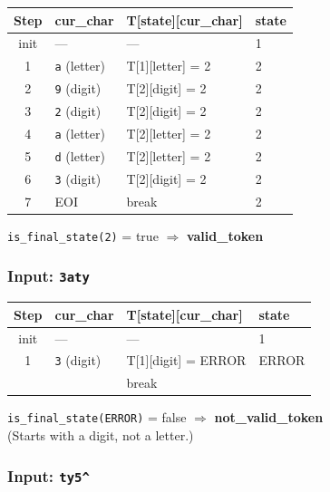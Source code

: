 \documentclass[a4paper,12pt]{article}
\begin{document}
\begin{center}
\renewcommand{\arraystretch}{1.2}
\begin{tabular}{c|l|l|l}
\toprule
\textbf{Step} & \textbf{cur\_char} & \textbf{T[state][cur\_char]} & \textbf{state} \\
\midrule
init  & ---           & ---                       & 1 \\
1     & \texttt{a} (letter) & T[1][letter] = 2    & 2 \\
2     & \texttt{9} (digit)  & T[2][digit] = 2     & 2 \\
3     & \texttt{2} (digit)  & T[2][digit] = 2     & 2 \\
4     & \texttt{a} (letter) & T[2][letter] = 2    & 2 \\
5     & \texttt{d} (letter) & T[2][letter] = 2    & 2 \\
6     & \texttt{3} (digit)  & T[2][digit] = 2     & 2 \\
7     & EOI                 & break                & 2 \\
\bottomrule
\end{tabular}
\end{center}
\texttt{is\_final\_state(2)} = true $\Rightarrow$ \textbf{valid\_token}

\subsubsection*{Input: \texttt{3aty}}

\begin{center}
\renewcommand{\arraystretch}{1.2}
\begin{tabular}{c|l|l|l}
\toprule
\textbf{Step} & \textbf{cur\_char} & \textbf{T[state][cur\_char]} & \textbf{state} \\
\midrule
init  & ---               & ---                       & 1 \\
1     & \texttt{3} (digit) & T[1][digit] = ERROR      & ERROR \\
      &                    & break                     & \\
\bottomrule
\end{tabular}
\end{center}
\texttt{is\_final\_state(ERROR)} = false $\Rightarrow$ \textbf{not\_valid\_token}\\
(Starts with a digit, not a letter.)

\subsubsection*{Input: \texttt{ty5\^{}}}
\end{document}

